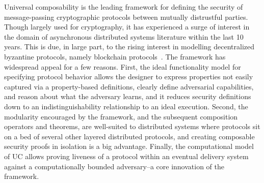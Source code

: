 
Universal composability is the leading framework for defining the security of message-passing cryptographic protocols between mutually distrustful parties.
Though largely used for cryptography, it has experienced a surge of interest in the domain of asynchronous distributed systems literature within the last 10 years.
This is due, in large part, to the rising interest in modelling decentralized byzantine protocols, namely blockchain protocols~\cite{kosba2016hawk, badertscher2018ouroboros, miller2019sprites, badertscher2024bitcoin, dziembowski2018fairswap, aumayr2021blitz, kiayias2020composable}.
The framework has widespread appeal for a few reasons. 
First, the ideal functionality model for specifying protocol behavior allows the designer to express properties not easily captured via a property-based definitions, clearly define adversarial capabilities, and reason about what the adversary learns, and it reduces security definitions down to an indistinguishability relationship to an ideal execution.
Second, the modularity encouraged by the framework, and the subsequent composition operators and theorems, are well-suited to distributed systems where protocols sit on a bed of several other layered distributed protocols, and creating composable security proofs in isolation is a big advantage.
Finally, the computational model of UC allows proving liveness of a protocol within an eventual delivery system against a computationally bounded adversary--a core innovation of the framework.

